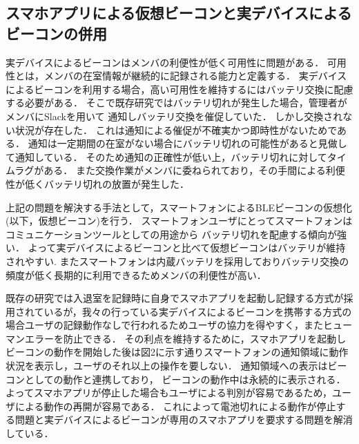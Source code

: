 
\subsection{スマホアプリによる仮想ビーコンと実デバイスによるビーコンの併用}



実デバイスによるビーコンはメンバの利便性が低く可用性に問題がある．
可用性とは，メンバの在室情報が継続的に記録される能力と定義する．
実デバイスによるビーコンを利用する場合，高い可用性を維持するにはバッテリ交換に配慮する必要がある．
そこで既存研究ではバッテリ切れが発生した場合，管理者がメンバにSlackを用いて
通知しバッテリ交換を催促していた．
しかし交換されない状況が存在した．
これは通知による催促が不確実かつ即時性がないためである．
通知は一定期間の在室がない場合にバッテリ切れの可能性があると見做して通知している．
そのため通知の正確性が低い上，バッテリ切れに対してタイムラグがある．
また交換作業がメンバに委ねられており，その手間による利便性が低くバッテリ切れの放置が発生した．


上記の問題を解決する手法として，スマートフォンによるBLEビーコンの仮想化(以下，仮想ビーコン)を行う．
スマートフォンユーザにとってスマートフォンはコミュニケーションツールとしての用途から
バッテリ切れを配慮する傾向が強い．
よって実デバイスによるビーコンと比べて仮想ビーコンはバッテリが維持されやすい.
またスマートフォンは内蔵バッテリを採用しておりバッテリ交換の頻度が低く長期的に利用できるためメンバの利便性が高い．



 既存の研究では入退室を記録時に自身でスマホアプリを起動し記録する方式が採用されているが，我々の行っている実デバイスによるビーコンを携帯する方式の場合ユーザの記録動作なしで行われるためユーザの協力を得やすく，またヒューマンエラーを防止できる．
その利点を維持するために，スマホアプリを起動しビーコンの動作を開始した後は図2に示す通りスマートフォンの通知領域に動作状況を表示し，ユーザのそれ以上の操作を要しない．
通知領域への表示はビーコンとしての動作と連携しており， ビーコンの動作中は永続的に表示される．
よってスマホアプリが停止した場合もユーザによる判別が容易であるため，ユーザによる動作の再開が容易である．
これによって電池切れによる動作が停止する問題と実デバイスによるビーコンが専用のスマホアプリを要求する問題を解消している．

